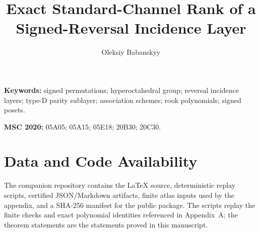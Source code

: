 \documentclass[11pt,a4paper]{article}
\title{Exact Standard-Channel Rank of a Signed-Reversal Incidence Layer}
\author{Oleksiy Babanskyy}
\date{}
\begin{document}
\pagestyle{plain}
\maketitle

\begin{abstract}

\end{abstract}

\smallskip
\noindent\textbf{Keywords:} signed permutations; hyperoctahedral group; reversal incidence layers; type-D parity sublayer; association schemes; rook polynomials; signed posets.

\smallskip
\noindent\textbf{MSC 2020:} 05A05; 05A15; 05E18; 20B30; 20C30.













\appendix

\FloatBarrier


\section*{Data and Code Availability}
The companion repository contains the LaTeX source, deterministic replay scripts, certified JSON/Markdown artifacts, finite atlas inputs used by the appendix, and a SHA-256 manifest for the public package. The scripts replay the finite checks and exact polynomial identities referenced in Appendix~A; the theorem statements are the statements proved in this manuscript.



\end{document}
